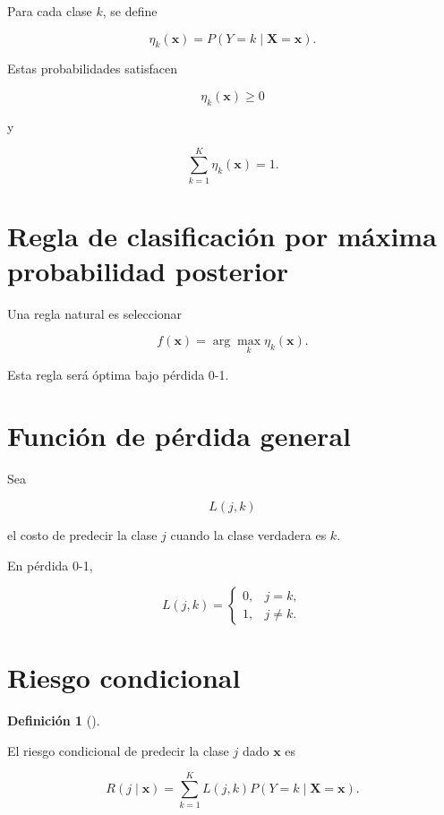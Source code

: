 \documentclass[
  spanish,
  10.5pt,
  letterpaper,
  DIV=11,
  numbers=noendperiod,
  oneside,
  open=any]{scrreprt}
\theoremstyle{definition}
\newtheorem{definition}{Definición}[chapter]
\theoremstyle{definition}
\theoremstyle{plain}
\theoremstyle{remark}
\begin{document}
Para cada clase \(k\), se define

\[
\eta_k(\mathbf{x})
=
P(Y=k\mid\mathbf{X}=\mathbf{x}).
\]

Estas probabilidades satisfacen

\[
\eta_k(\mathbf{x})\geq 0
\]

y

\[
\sum_{k=1}^{K}
\eta_k(\mathbf{x})
=
1.
\]

\section*{Regla de clasificación por máxima probabilidad
posterior}\label{regla-de-clasificaciuxf3n-por-muxe1xima-probabilidad-posterior}


Una regla natural es seleccionar

\[
f(\mathbf{x})
=
\arg\max_{k}
\eta_k(\mathbf{x}).
\]

Esta regla será óptima bajo pérdida 0-1.

\section*{Función de pérdida
general}\label{funciuxf3n-de-puxe9rdida-general}


Sea

\[
L(j,k)
\]

el costo de predecir la clase \(j\) cuando la clase verdadera es \(k\).

En pérdida 0-1,

\[
L(j,k)
=
\begin{cases}
0, & j=k,\\
1, & j\neq k.
\end{cases}
\]

\section*{Riesgo condicional}\label{riesgo-condicional}


\begin{definition}[]\protect\hypertarget{def-riesgo-condicional}{}\label{def-riesgo-condicional}

El riesgo condicional de predecir la clase \(j\) dado \(\mathbf{x}\) es

\[
R(j\mid\mathbf{x})
=
\sum_{k=1}^{K}
L(j,k)
P(Y=k\mid\mathbf{X}=\mathbf{x}).
\]

\end{definition}
\end{document}
